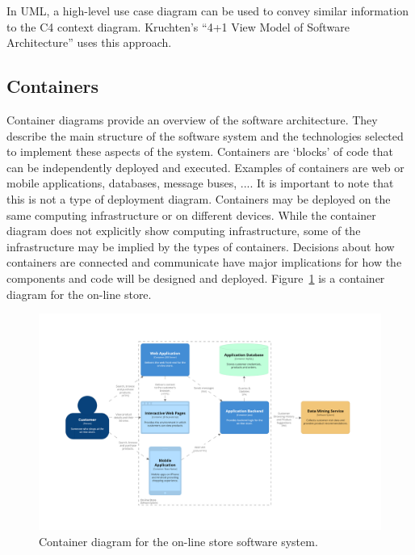 In UML, a high-level use case diagram can be used to convey similar information to the C4 context diagram.
Kruchten's ``4+1 View Model of Software Architecture'' \cite{4+1-model} uses this approach.

\subsection{Containers}
Container diagrams provide an overview of the software architecture.
They describe the main structure of the software system and the technologies selected to implement these aspects of the system.
Containers are `blocks' of code that can be independently deployed and executed.
Examples of containers are web or mobile applications, databases, message buses, ....
It is important to note that this is not a type of deployment diagram.
Containers may be deployed on the same computing infrastructure or on different devices.
While the container diagram does not explicitly show computing infrastructure, some of the infrastructure may be implied by the types of containers.
Decisions about how containers are connected and communicate have major implications for how the components and code will be designed and deployed.
Figure~\ref{fig:c4_container_store} is a container diagram for the on-line store.

\begin{figure}[h!]
    \centering
    \begin{adjustwidth}{-9mm}{-9mm}
        \includegraphics[trim=250 226 286 258,clip,width=0.96\paperwidth]{images/c4/store_container_diagram.png}
    \end{adjustwidth}
    \caption{Container diagram for the on-line store software system.}
    \label{fig:c4_container_store}
\end{figure}

